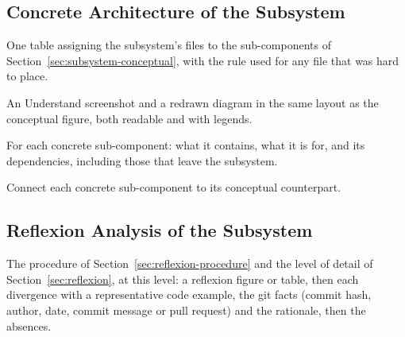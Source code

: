 \subsection{Concrete Architecture of the Subsystem}
\label{sec:subsystem-concrete}

\begin{requirements}
  \item One table assigning the subsystem's files to the sub-components of Section~\ref{sec:subsystem-conceptual}, with the rule used for any file that was hard to place.
  \item An Understand screenshot and a redrawn diagram in the same layout as the conceptual figure, both readable and with legends.
  \item For each concrete sub-component: what it contains, what it is for, and its dependencies, including those that leave the subsystem.
  \item Connect each concrete sub-component to its conceptual counterpart.
\end{requirements}

\subsection{Reflexion Analysis of the Subsystem}
\label{sec:subsystem-reflexion}

\begin{requirements}
  \item The procedure of Section~\ref{sec:reflexion-procedure} and the level of detail of Section~\ref{sec:reflexion}, at this level: a reflexion figure or table, then each divergence with a representative code example, the git facts (commit hash, author, date, commit message or pull request) and the rationale, then the absences.
\end{requirements}
